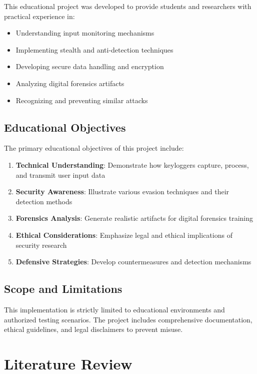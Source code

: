 \documentclass[12pt,a4paper]{article}
\begin{document}
This educational project was developed to provide students and researchers with practical experience in:
\begin{itemize}
    \item Understanding input monitoring mechanisms
    \item Implementing stealth and anti-detection techniques
    \item Developing secure data handling and encryption
    \item Analyzing digital forensics artifacts
    \item Recognizing and preventing similar attacks
\end{itemize}

\subsection{Educational Objectives}

The primary educational objectives of this project include:

\begin{enumerate}
    \item \textbf{Technical Understanding}: Demonstrate how keyloggers capture, process, and transmit user input data
    \item \textbf{Security Awareness}: Illustrate various evasion techniques and their detection methods
    \item \textbf{Forensics Analysis}: Generate realistic artifacts for digital forensics training
    \item \textbf{Ethical Considerations}: Emphasize legal and ethical implications of security research
    \item \textbf{Defensive Strategies}: Develop countermeasures and detection mechanisms
\end{enumerate}

\subsection{Scope and Limitations}

This implementation is strictly limited to educational environments and authorized testing scenarios. The project includes comprehensive documentation, ethical guidelines, and legal disclaimers to prevent misuse.

\section{Literature Review}
\end{document}
